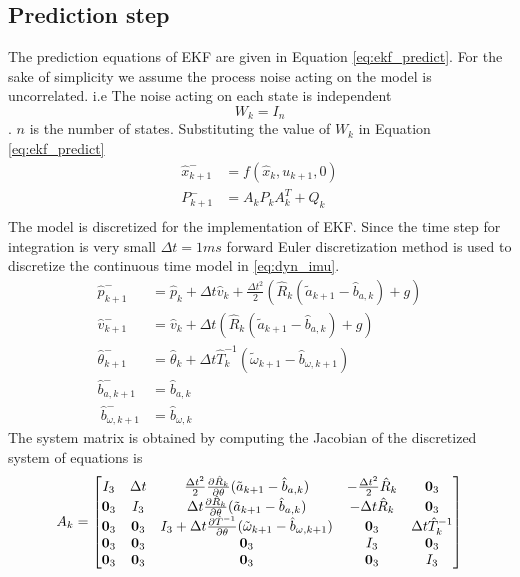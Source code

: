 \subsection{Prediction step}
The prediction equations of EKF are given in Equation \ref{eq:ekf_predict}. For the sake of simplicity we assume the process noise acting on the model is uncorrelated. i.e The noise acting on each state is independent $$W_k = I_n$$. $n$ is the number of states. Substituting the value of $W_k$ in Equation \ref{eq:ekf_predict}
\begin{equation}
\label{eq:imu_predict}
\begin{split}
\hat{x}_{k+1}^- &= f(\hat{x}_{k},u_{k+1},0)\\
P_{k+1}^- &= A_kP_{k}A_k^T + Q_{k}\\
\end{split}
\end{equation}
The model is discretized for the implementation of EKF. Since the time step for integration is very small $\Delta t = 1ms$ forward Euler discretization method is used to discretize the continuous time model in \ref{eq:dyn_imu}.
\begin{equation}
    \label{eq:dyn_imu_disc}
    \begin{split}
    \hat{p}_{k+1}^- &= \hat{p}_k + \Delta t \hat{v}_k + \frac{\Delta t^2}{2} (\hat{R}_k (\tilde{a}_{k+1} - \hat{b}_{a,k})+g) \\
    \hat{v}_{k+1}^- &= \hat{v}_k + \Delta t (\hat{R}_k (\tilde{a}_{k+1} - \hat{b}_{a,k})+g) \\
    \hat{\theta}_{k+1}^- &= \hat{\theta}_k + \Delta t \hat{T}_k^{-1}(\tilde{\omega}_{k+1} - \hat{b}_{\omega,k+1}) \\
    \hat{b}_{a,k+1}^- &= \hat{b}_{a,k}\\\
    \hat{b}_{\omega,k+1}^- &= \hat{b}_{\omega,k}
    \end{split}
\end{equation}
The system matrix is obtained by computing the Jacobian of the discretized system of equations is
\begin{equation}
    A_k = \begin{bmatrix}
    I_3 &\Delta t &\frac{\Delta t^2}{2} \frac{\partial {\hat{R}_k}}{\partial {\theta}}(\tilde{a}_{k+1} - \hat{b}_{a,k} ) &-\frac{\Delta t^2}{2} \hat{R}_k &\textbf{0}_3 \\
    \textbf{0}_3 &I_3  &\Delta t \frac{\partial {\hat{R}_k}}{\partial {\theta}}(\tilde{a}_{k+1} - \hat{b}_{a,k} ) &-\Delta t\hat{R}_k &\textbf{0}_3\\
    \textbf{0}_3  &\textbf{0}_3 &I_3 + \Delta t \frac{\partial {\hat{T}^{-1}}}{\partial {\theta}}(\tilde{\omega}_{k+1} - \hat{b}_{\omega,k+1}) &\textbf{0}_3 &\Delta t \hat{T}_k^{-1}\\
    \textbf{0}_3  &\textbf{0}_3  &\textbf{0}_3  &I_3 &\textbf{0}_3 \\
    \textbf{0}_3  &\textbf{0}_3  &\textbf{0}_3  &\textbf{0}_3 &I_3
    \end{bmatrix}
\end{equation}

